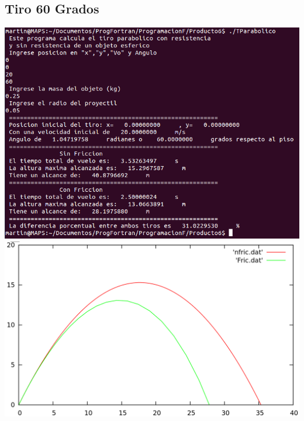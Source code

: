\documentclass[12pt]{article}
\begin{document}
\subsection{Tiro 60 Grados}
\begin{center}
\includegraphics[width=15cm]{Tiro60g20v.png}
\includegraphics[width=15cm]{Tiro60g.png}
\end{center}
\end{document}
